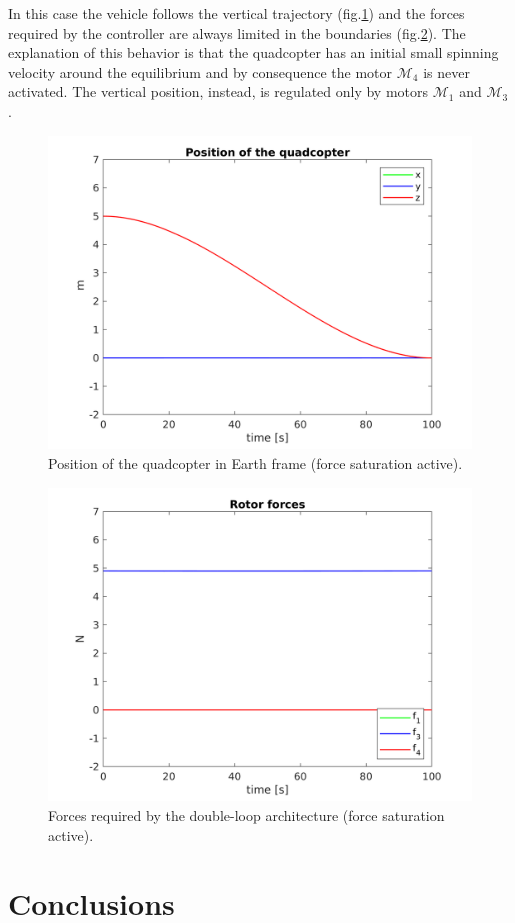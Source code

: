 \documentclass[11pt,a4paper]{scrartcl}
\begin{document}
In this case the vehicle follows the vertical trajectory (fig.\ref{fig:positionsetpoint}) and the forces required by the controller are always limited in the boundaries (fig.\ref{fig:forcessetpoint}). The explanation of this behavior is that the quadcopter has an initial small spinning velocity around the equilibrium and by consequence the motor $ \mathcal{M}_4 $ is never activated. The vertical position, instead, is regulated only by motors $ \mathcal{M}_1 $ and $ \mathcal{M}_3 $.

\begin{figure}[H]
	\centering
	\includegraphics[width=0.6\linewidth]{Images/Position_SetPoint}
	\caption{Position of the quadcopter in Earth frame (force saturation active).}
	\label{fig:positionsetpoint}
\end{figure}

\begin{figure}
	\centering
	\includegraphics[width=0.6\linewidth]{Images/Forces_SetPoint}
	\caption{Forces required by the double-loop architecture (force saturation active).}
	\label{fig:forcessetpoint}
\end{figure}

\newpage

\section{Conclusions}
\end{document}
